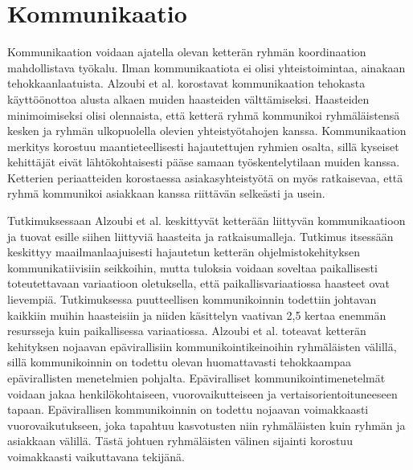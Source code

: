 \section{Kommunikaatio}

Kommunikaation voidaan ajatella olevan ketterän ryhmän koordinaation mahdollistava työkalu. Ilman kommunikaatiota ei olisi yhteistoimintaa, ainakaan tehokkaanlaatuista. Alzoubi et al. \cite{ALZOUBI201622} korostavat kommunikaation tehokasta käyttöönottoa alusta alkaen muiden haasteiden välttämiseksi. Haasteiden minimoimiseksi olisi olennaista, että ketterä ryhmä kommunikoi ryhmäläistensä kesken ja ryhmän ulkopuolella olevien yhteistyötahojen kanssa. Kommunikaation merkitys korostuu maantieteellisesti hajautettujen ryhmien osalta, sillä kyseiset kehittäjät eivät lähtökohtaisesti pääse samaan työskentelytilaan muiden kanssa. Ketterien periaatteiden korostaessa asiakasyhteistyötä on myös ratkaisevaa, että ryhmä kommunikoi asiakkaan kanssa riittävän selkeästi ja usein.

Tutkimuksessaan Alzoubi et al. \cite{ALZOUBI201622} keskittyvät ketterään liittyvän kommunikaatioon ja tuovat esille siihen liittyviä haasteita ja ratkaisumalleja. Tutkimus itsessään keskittyy maailmanlaajuisesti hajautetun ketterän ohjelmistokehityksen kommunikatiivisiin seikkoihin, mutta tuloksia voidaan soveltaa paikallisesti toteutettavaan variaatioon oletuksella, että paikallisvariaatiossa haasteet ovat lievempiä. Tutkimuksessa puutteellisen kommunikoinnin todettiin johtavan kaikkiin muihin haasteisiin ja niiden käsittelyn vaativan 2,5 kertaa enemmän resursseja kuin paikallisessa variaatiossa. Alzoubi et al. toteavat ketterän kehityksen nojaavan epävirallisiin kommunikointikeinoihin ryhmäläisten välillä, sillä kommunikoinnin on todettu olevan huomattavasti tehokkaampaa epävirallisten menetelmien pohjalta. Epäviralliset kommunikointimenetelmät voidaan jakaa henkilökohtaiseen, vuorovaikutteiseen ja vertaisorientoituneeseen tapaan. Epävirallisen kommunikoinnin on todettu nojaavan voimakkaasti vuorovaikutukseen, joka tapahtuu kasvotusten niin ryhmäläisten kuin ryhmän ja asiakkaan välillä. Tästä johtuen ryhmäläisten välinen sijainti korostuu voimakkaasti vaikuttavana tekijänä.

